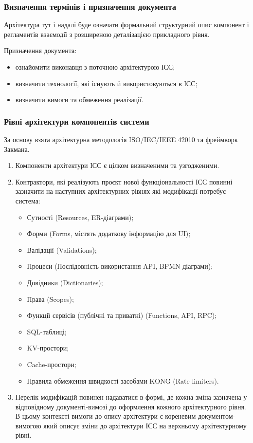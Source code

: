 \documentclass{article}
\begin{document}
\subsubsection{Визначення термінів і призначення документа}

Архітектура тут і надалі буде означати формальний структурний опис компонент і регламентів взаємодії з розширеною деталізацією прикладного рівня.

Призначення документа:
\begin{itemize}
  \item ознайомити виконавця з поточною архітектурою ІСС;
  \item визначити технології, які існують й використовуються в ІСС;
  \item визначити вимоги та обмеження реалізації.
\end{itemize}

\subsubsection{Рівні архітектури компонентів системи}

За основу взята архітектурна методологія ISO/IEC/IEEE 42010 та фреймворк Закмана.

\begin{enumerate}
  \item Компоненти архітектури ІСС є цілком визначеними та узгодженими.
  \item Контрактори, які реалізують проєкт нової функціональності ІСС повинні зазначити на
        наступних архітектурних рівнях які модифікації потребує система:
    \begin{itemize}
      \item Сутності (Resources, ER-діаграми);
      \item Форми (Forms, містять додаткову інформацію для UI);
      \item Валідації (Validations);
      \item Процеси (Послідовність використання API, BPMN діаграми);
      \item Довідники (Dictionaries);
      \item Права (Scopes);
      \item Функції сервісів (публічні та приватні) (Functions, API, RPC);
      \item SQL-таблиці;
      \item KV-простори;
      \item Cache-простори;
      \item Правила обмеження швидкості засобами KONG (Rate limiters).
    \end{itemize}
  \item Перелік модифікацій повинен надаватися в формі, де кожна зміна зазначена у відповідному
        документі-вимозі до оформлення кожного архітектурного рівня. В цьому контексті вимоги
        до опису архітектури є кореневим документом-вимогою який описує зміни до архітектури ІСС
        на верхньому архітектурному рівні.
\end{enumerate}
\end{document}
